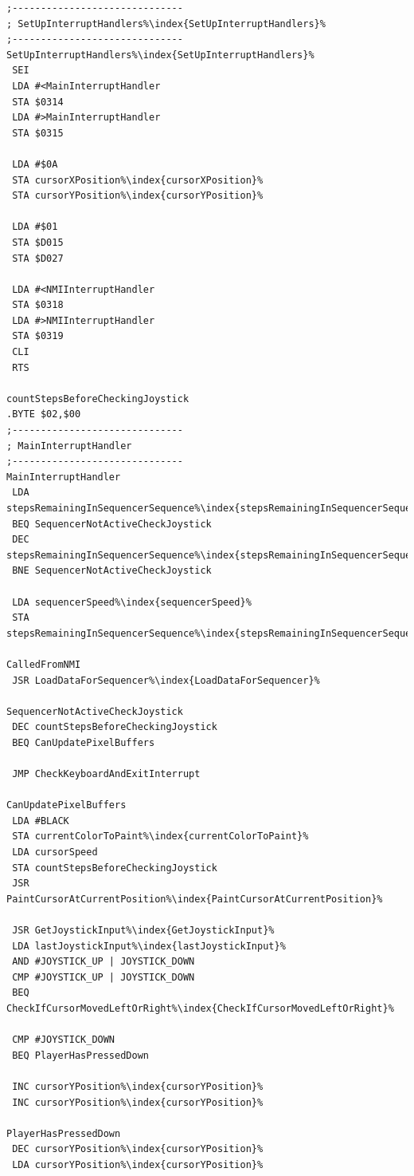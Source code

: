 \begin{minipage}[b]{0.33\linewidth}
\begin{lrbox}{\mybox}%
\begin{lstlisting}[basicstyle=\ttfamily\tiny,escapechar=\%]
;------------------------------
; SetUpInterruptHandlers%\index{SetUpInterruptHandlers}%
;------------------------------
SetUpInterruptHandlers%\index{SetUpInterruptHandlers}%
 SEI
 LDA #<MainInterruptHandler
 STA $0314
 LDA #>MainInterruptHandler
 STA $0315

 LDA #$0A
 STA cursorXPosition%\index{cursorXPosition}%
 STA cursorYPosition%\index{cursorYPosition}%

 LDA #$01
 STA $D015
 STA $D027

 LDA #<NMIInterruptHandler
 STA $0318
 LDA #>NMIInterruptHandler
 STA $0319
 CLI
 RTS

countStepsBeforeCheckingJoystick   
.BYTE $02,$00
;------------------------------
; MainInterruptHandler
;------------------------------
MainInterruptHandler
 LDA stepsRemainingInSequencerSequence%\index{stepsRemainingInSequencerSequence}%
 BEQ SequencerNotActiveCheckJoystick
 DEC stepsRemainingInSequencerSequence%\index{stepsRemainingInSequencerSequence}%
 BNE SequencerNotActiveCheckJoystick

 LDA sequencerSpeed%\index{sequencerSpeed}%
 STA stepsRemainingInSequencerSequence%\index{stepsRemainingInSequencerSequence}%

CalledFromNMI
 JSR LoadDataForSequencer%\index{LoadDataForSequencer}%

SequencerNotActiveCheckJoystick
 DEC countStepsBeforeCheckingJoystick
 BEQ CanUpdatePixelBuffers

 JMP CheckKeyboardAndExitInterrupt

CanUpdatePixelBuffers
 LDA #BLACK
 STA currentColorToPaint%\index{currentColorToPaint}%
 LDA cursorSpeed
 STA countStepsBeforeCheckingJoystick
 JSR PaintCursorAtCurrentPosition%\index{PaintCursorAtCurrentPosition}%

 JSR GetJoystickInput%\index{GetJoystickInput}%
 LDA lastJoystickInput%\index{lastJoystickInput}%
 AND #JOYSTICK_UP | JOYSTICK_DOWN
 CMP #JOYSTICK_UP | JOYSTICK_DOWN
 BEQ CheckIfCursorMovedLeftOrRight%\index{CheckIfCursorMovedLeftOrRight}%

 CMP #JOYSTICK_DOWN
 BEQ PlayerHasPressedDown

 INC cursorYPosition%\index{cursorYPosition}%
 INC cursorYPosition%\index{cursorYPosition}%

PlayerHasPressedDown
 DEC cursorYPosition%\index{cursorYPosition}%
 LDA cursorYPosition%\index{cursorYPosition}%


\end{lstlisting}
\end{lrbox}
\end{minipage}
